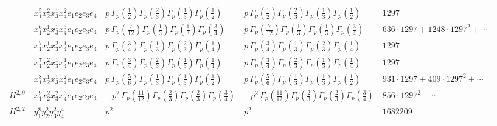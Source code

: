 \documentclass[11pt]{article}
\begin{document}
\begin{table}[ht]
{\begin{tabular}{@{}lllll@{}}
 & $x_{1}^{5} x_{2}^{2} x_{3}^{1} x_{4}^{2}  e_{1} e_{2} e_{3} e_{4}$ & $p \, \Gamma_p \left( \frac{1}{2} \right) \Gamma_p \left( \frac{2}{3} \right) \Gamma_p \left( \frac{1}{3} \right) \Gamma_p \left( \frac{1}{2} \right)$ & $p \, \Gamma_p \left( \frac{1}{2} \right) \Gamma_p \left( \frac{2}{3} \right) \Gamma_p \left( \frac{1}{3} \right) \Gamma_p \left( \frac{1}{2} \right)$ & $1297$ \\
 & $x_{1}^{6} x_{2}^{1} x_{3}^{1} x_{4}^{3}  e_{1} e_{2} e_{3} e_{4}$ & $p \, \Gamma_p \left( \frac{7}{12} \right) \Gamma_p \left( \frac{1}{3} \right) \Gamma_p \left( \frac{1}{3} \right) \Gamma_p \left( \frac{3}{4} \right)$ & $p \, \Gamma_p \left( \frac{7}{12} \right) \Gamma_p \left( \frac{1}{3} \right) \Gamma_p \left( \frac{1}{3} \right) \Gamma_p \left( \frac{3}{4} \right)$ & $636{\cdot}1297{+}1248{\cdot}1297^{2}{+}\cdots$ \\
 & $x_{1}^{7} x_{2}^{1} x_{3}^{2} x_{4}^{1}  e_{1} e_{2} e_{3} e_{4}$ & $p \, \Gamma_p \left( \frac{3}{4} \right) \Gamma_p \left( \frac{1}{3} \right) \Gamma_p \left( \frac{2}{3} \right) \Gamma_p \left( \frac{1}{4} \right)$ & $p \, \Gamma_p \left( \frac{3}{4} \right) \Gamma_p \left( \frac{1}{3} \right) \Gamma_p \left( \frac{2}{3} \right) \Gamma_p \left( \frac{1}{4} \right)$ & $1297$ \\
 & $x_{1}^{7} x_{2}^{2} x_{3}^{1} x_{4}^{1}  e_{1} e_{2} e_{3} e_{4}$ & $p \, \Gamma_p \left( \frac{3}{4} \right) \Gamma_p \left( \frac{2}{3} \right) \Gamma_p \left( \frac{1}{3} \right) \Gamma_p \left( \frac{1}{4} \right)$ & $p \, \Gamma_p \left( \frac{3}{4} \right) \Gamma_p \left( \frac{2}{3} \right) \Gamma_p \left( \frac{1}{3} \right) \Gamma_p \left( \frac{1}{4} \right)$ & $1297$ \\
 & $x_{1}^{8} x_{2}^{1} x_{3}^{1} x_{4}^{2}  e_{1} e_{2} e_{3} e_{4}$ & $p \, \Gamma_p \left( \frac{5}{6} \right) \Gamma_p \left( \frac{1}{3} \right) \Gamma_p \left( \frac{1}{3} \right) \Gamma_p \left( \frac{1}{2} \right)$ & $p \, \Gamma_p \left( \frac{5}{6} \right) \Gamma_p \left( \frac{1}{3} \right) \Gamma_p \left( \frac{1}{3} \right) \Gamma_p \left( \frac{1}{2} \right)$ & $931{\cdot}1297{+}409{\cdot}1297^{2}{+}\cdots$ \\
\midrule
$H^{2,0}$ & $x_{1}^{9} x_{2}^{2} x_{3}^{2} x_{4}^{3}  e_{1} e_{2} e_{3} e_{4}$ & $- p^{2} \, \Gamma_p \left( \frac{11}{12} \right) \Gamma_p \left( \frac{2}{3} \right) \Gamma_p \left( \frac{2}{3} \right) \Gamma_p \left( \frac{3}{4} \right)$ & $- p^{2} \, \Gamma_p \left( \frac{11}{12} \right) \Gamma_p \left( \frac{2}{3} \right) \Gamma_p \left( \frac{2}{3} \right) \Gamma_p \left( \frac{3}{4} \right)$ & $856{\cdot}1297^{2}{+}\cdots$ \\
\midrule
$H^{2,2}$ & $y_{1}^{8} y_{2}^{2} y_{3}^{2} y_{4}^{4}$ & $p^{2} \,$ & $p^{2} \,$ & $1682209$ \\
\bottomrule
\end{tabular}
}
\renewcommand{\arraystretch}{1.0}
\end{table}
\end{document}
